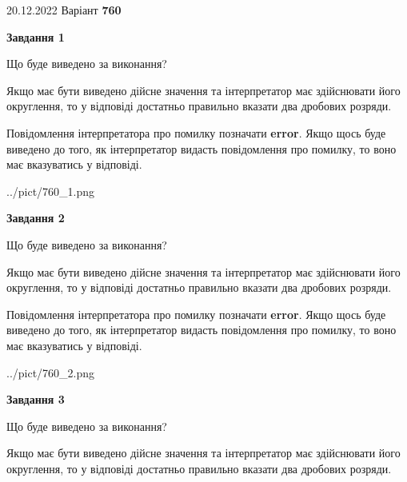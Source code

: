 \documentclass[12pt, ukrainian]{article}
\begin{document}
{20.12.2022 Варіант \No \textbf { 760 }\par}
{
\begin {Large}

{\begin {center}\textbf{Завдання 1}\end {center}}\par
Що буде виведено за виконання? \par

Якщо має бути виведено дійсне значення та інтерпретатор має здійснювати його округлення, 
то у відповіді достатньо правильно вказати два дробових розряди.

Повідомлення інтерпретатора про помилку позначати \textbf{error}.
Якщо щось буде виведено до того, як інтерпретатор видасть повідомлення про помилку, 
то воно має вказуватись у відповіді. \par

\begin{center}
	{../pict/760_1.png}
\end{center}
\newpage

{\begin {center}\textbf{Завдання 2}\end {center}}\par
Що буде виведено за виконання? \par

Якщо має бути виведено дійсне значення та інтерпретатор має здійснювати його округлення, 
то у відповіді достатньо правильно вказати два дробових розряди.

Повідомлення інтерпретатора про помилку позначати \textbf{error}.
Якщо щось буде виведено до того, як інтерпретатор видасть повідомлення про помилку, 
то воно має вказуватись у відповіді. \par

\begin{center}
	{../pict/760_2.png}
\end{center}
\newpage

{\begin {center}\textbf{Завдання 3}\end {center}}\par
Що буде виведено за виконання? \par

Якщо має бути виведено дійсне значення та інтерпретатор має здійснювати його округлення, 
то у відповіді достатньо правильно вказати два дробових розряди.


\end{Large}}
\end{document}
